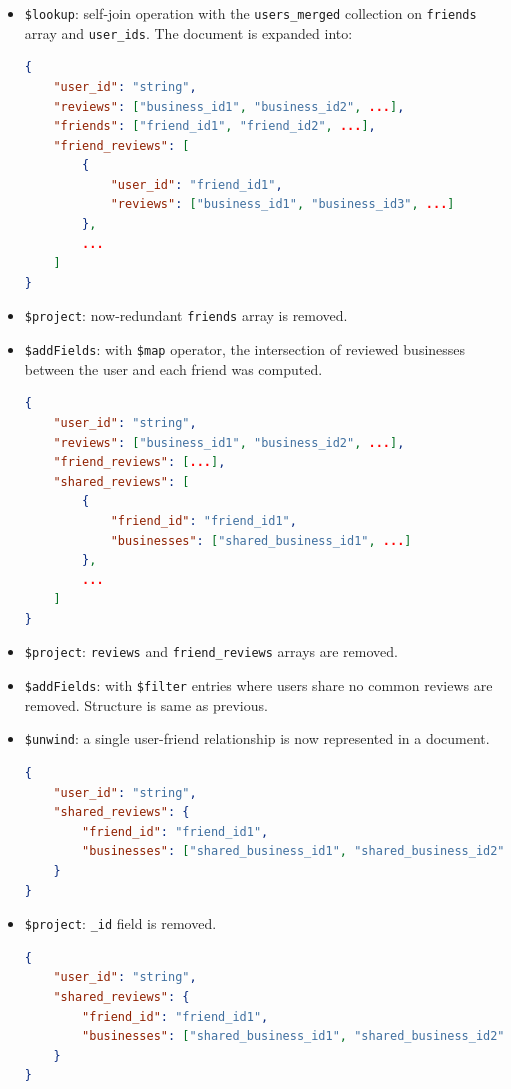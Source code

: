 \documentclass{Configuration_Files/PoliMi3i_thesis}
\begin{document}
\begin{itemize}
\begin{itemize}
\item \texttt{\$lookup}: self-join operation with the \texttt{users\_merged} collection on \texttt{friends} array and \texttt{user\_ids}. The document is expanded into:

\begin{lstlisting}[language=json]
{
    "user_id": "string",
    "reviews": ["business_id1", "business_id2", ...],
    "friends": ["friend_id1", "friend_id2", ...],
    "friend_reviews": [
        {
            "user_id": "friend_id1",
            "reviews": ["business_id1", "business_id3", ...]
        },
        ...
    ]
}
\end{lstlisting}

\item \texttt{\$project}: now-redundant \texttt{friends} array is removed.


\item \texttt{\$addFields}: with \texttt{\$map} operator, the intersection of reviewed businesses between the user and each friend was computed.

\begin{lstlisting}[language=json]
{
    "user_id": "string",
    "reviews": ["business_id1", "business_id2", ...],
    "friend_reviews": [...],
    "shared_reviews": [
        {
            "friend_id": "friend_id1",
            "businesses": ["shared_business_id1", ...]
        },
        ...
    ]
}
\end{lstlisting}

\item \texttt{\$project}: \texttt{reviews} and \texttt{friend\_reviews} arrays are removed.

\item \texttt{\$addFields}: with \texttt{\$filter} entries where users share no common reviews are removed. Structure is same as previous.

\item \texttt{\$unwind}: a single user-friend relationship is now represented in a document.

\begin{lstlisting}[language=json]
{
    "user_id": "string",
    "shared_reviews": {
        "friend_id": "friend_id1",
        "businesses": ["shared_business_id1", "shared_business_id2", ...]
    }
}
\end{lstlisting}

\item \texttt{\$project}: \texttt{\_id} field is removed. 

\begin{lstlisting}[language=json]
{
    "user_id": "string",
    "shared_reviews": {
        "friend_id": "friend_id1",
        "businesses": ["shared_business_id1", "shared_business_id2", ...]
    }
}
\end{lstlisting}
\end{itemize}


\end{itemize}
\end{document}
